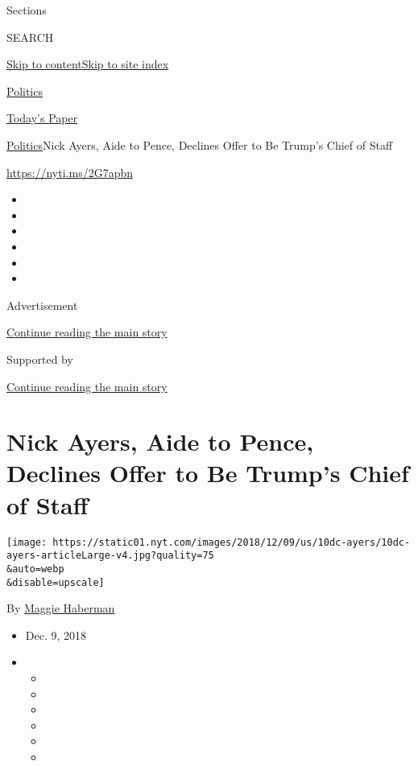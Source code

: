 Sections

SEARCH

\protect\hyperlink{site-content}{Skip to
content}\protect\hyperlink{site-index}{Skip to site index}

\href{https://www.nytimes.com/section/politics}{Politics}

\href{https://myaccount.nytimes.com/auth/login?response_type=cookie\&client_id=vi}{}

\href{https://www.nytimes.com/section/todayspaper}{Today's Paper}

\href{/section/politics}{Politics}\textbar{}Nick Ayers, Aide to Pence,
Declines Offer to Be Trump's Chief of Staff

\url{https://nyti.ms/2G7apbn}

\begin{itemize}
\item
\item
\item
\item
\item
\item
\end{itemize}

Advertisement

\protect\hyperlink{after-top}{Continue reading the main story}

Supported by

\protect\hyperlink{after-sponsor}{Continue reading the main story}

\hypertarget{nick-ayers-aide-to-pence-declines-offer-to-be-trumps-chief-of-staff}{%
\section{Nick Ayers, Aide to Pence, Declines Offer to Be Trump's Chief
of
Staff}\label{nick-ayers-aide-to-pence-declines-offer-to-be-trumps-chief-of-staff}}

\texttt{[image: https://static01.nyt.com/images/2018/12/09/us/10dc-ayers/10dc-ayers-articleLarge-v4.jpg?quality=75\\\&auto=webp\\\&disable=upscale]}

By \href{https://www.nytimes.com/by/maggie-haberman}{Maggie Haberman}

\begin{itemize}
\item
  Dec. 9, 2018
\item
  \begin{itemize}
  \item
  \item
  \item
  \item
  \item
  \item
  \end{itemize}
\end{itemize}

